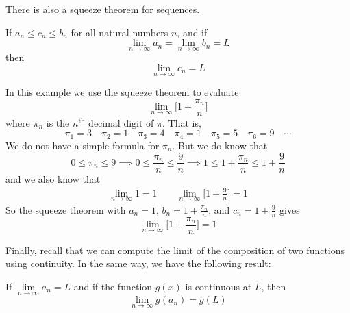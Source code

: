 There is also a squeeze theorem for sequences.

\begin{theorem}\label{thm:SRsqueeze}
If $a_n\le c_n\le b_n$ for all natural numbers $n$, and if
\begin{equation*}
\lim_{n\rightarrow\infty}a_n=\lim_{n\rightarrow\infty}b_n=L
\end{equation*}
then\begin{equation*}
\lim_{n\rightarrow\infty}c_n=L
\end{equation*}
\end{theorem}

\begin{eg}\label{eg:SRsqueeze}
In this example we use the squeeze theorem to evaluate
\begin{equation*}
\lim_{n\rightarrow\infty}\Big[1+\frac{\pi_n}{n}\Big]
\end{equation*}
where $\pi_n$ is the $n^{\mathrm{th}}$ decimal digit of $\pi$.
That is,
\begin{equation*}
\pi_1=3\quad \pi_2=1 \quad \pi_3=4 \quad \pi_4=1 \quad \pi_5=5
\quad\pi_6=9\quad\cdots
\end{equation*}
We do not have a simple formula for $\pi_n$. But we do know that
\begin{equation*}
0\le\pi_n\le 9
\implies 0 \le \frac{\pi_n}{n} \le \frac{9}{n}
\implies 1 \le 1+\frac{\pi_n}{n} \le 1+\frac{9}{n}
\end{equation*}
and we also know that
\begin{align*}
\lim_{n\rightarrow\infty} 1 = 1\qquad
\lim_{n\rightarrow\infty} \Big[1+\frac{9}{n}\Big] = 1
\end{align*}
So the squeeze theorem with $a_n=1$, $b_n=1+\frac{\pi_n}{n}$,
and $c_n=1+\frac{9}{n}$ gives
\begin{equation*}
\lim_{n\rightarrow\infty}\Big[1+\frac{\pi_n}{n}\Big] = 1
\end{equation*}
\end{eg}

Finally, recall that we can compute the limit of the composition
of two functions using continuity. In the same
way, we have the following result:
\begin{theorem}\label{thm:SRcontfn}
If
$\lim\limits_{n\rightarrow\infty}a_n=L
$
and if the function $g(x)$ is continuous at $L$, then
\begin{equation*}
\lim_{n\rightarrow\infty}g(a_n)=g(L)
\end{equation*}
\end{theorem}

